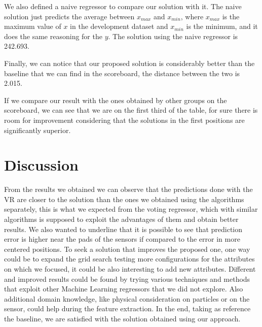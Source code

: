 \documentclass[conference]{IEEEtran}
\begin{document}
We also defined a naive regressor to compare our solution with it. The naive solution just predicts the average between $x_{max}$ and $x_{min}$, where $x_{max}$ is the maximum value of $x$ in the development dataset and $x_{min}$ is the minimum, and it does the same reasoning for the $y$.
The solution using the naive regressor is 242.693.

Finally, we can notice that our proposed solution is considerably better than the baseline that we can find in the scoreboard, the distance between the two is 2.015.

If we compare our result with the ones obtained by other groups on the scoreboard, we can see that we are on the first third of the table, for sure there is room for improvement considering that the solutions in the first positions are significantly superior.

\section{Discussion}
From the results we obtained we can observe that the predictions done with the VR are closer to the solution than the ones we obtained using the algorithms separately, this is what we expected from the voting regressor, which with similar algorithms is supposed to exploit the advantages of them and obtain better results.
We also wanted to underline that it is possible to see that prediction error is higher near the pads of the sensors if compared to the error in more centered positions.
To seek a solution that improves the proposed one, one way could be to expand the grid search testing more configurations for the attributes on which we focused, it could be also interesting to add new attributes. 
Different and improved results could be found by trying various techniques and methods that exploit other Machine Learning regressors that we did not explore.
Also additional domain knowledge, like physical consideration on particles or on the sensor, could help during the feature extraction.
In the end, taking as reference the baseline, we are satisfied with the solution obtained using our approach.




\end{document}
